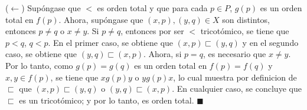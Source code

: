 \documentclass[11pt]{article}
\newcommand{\QED}{\hfill\ensuremath{\blacksquare}}
\begin{document}
    ($\leftarrow$) Supóngase que $<$ es orden total y que para cada $p \in P$, $g(p)$ es un orden total en $f(p)$. Ahora, supóngase que $(x,p),(y,q) \in X$ son distintos, entonces $p \neq q$ o $x \neq y$. Si $p \neq q$, entonces por ser $<$ tricotómico, se tiene que $p<q$, $q<p$. En el primer caso, se obtiene que $(x,p) \sqsubset (y,q)$ y en el segundo caso, se obtiene que $(y,q) \sqsubset (x,p)$. Ahora, si $p=q$, es necesario que $x \neq y$. Por lo tanto, como $g(p)=g(q)$ es un orden total en $f(p)=f(q)$ y $x,y \in f(p)$, se tiene que $x \mathrel{g(p)} y$ o $y \mathrel{g(p)} x$, lo cual muestra por definicion de $\sqsubset$ que $(x,p) \sqsubset (y,q)$ o $(y,q) \sqsubset (x,p)$. En cualquier caso, se concluye que $\sqsubset$ es un tricotómico; y por lo tanto, es orden total. \QED
\end{document}
